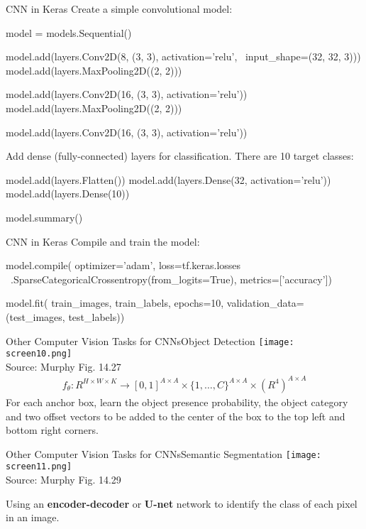 \documentclass[ignorenonframetext,xcolor=x11names]{beamer}
\begin{document}
\begin{frame}[fragile]{CNN in Keras}
Create a simple convolutional model:
\begin{pythoncode}
model = models.Sequential()

model.add(layers.Conv2D(8, (3, 3), activation='relu', \
    input_shape=(32, 32, 3)))
model.add(layers.MaxPooling2D((2, 2)))

model.add(layers.Conv2D(16, (3, 3), activation='relu'))
model.add(layers.MaxPooling2D((2, 2)))

model.add(layers.Conv2D(16, (3, 3), activation='relu'))
\end{pythoncode}
Add dense (fully-connected) layers for classification. There are 10 target classes:
\begin{pythoncode}
model.add(layers.Flatten())
model.add(layers.Dense(32, activation='relu'))
model.add(layers.Dense(10))

model.summary()
\end{pythoncode}
\end{frame}

\begin{frame}[fragile]{CNN in Keras}
Compile and train the model:
\begin{pythoncode}
model.compile(
    optimizer='adam',
    loss=tf.keras.losses \
        .SparseCategoricalCrossentropy(from_logits=True),
    metrics=['accuracy'])

model.fit(
    train_images, train_labels, epochs=10, 
    validation_data=(test_images, test_labels))
\end{pythoncode}
\end{frame}

\begin{frame}{Other Computer Vision Tasks for CNNs}{Object Detection}
\texttt{[image: screen10.png]} \\

\scriptsize Source: Murphy Fig. 14.27
\normalsize
\begin{align*}
f_\theta: R^{H\times W \times K} \rightarrow [0,1]^{A \times A} \times \{1, \ldots, C\}^{A \times A} \times (R^4)^{A \times A}
\end{align*}
For each anchor box, learn the object presence probability, the object category and two offset vectors to be added to the center of the box to the top left and bottom right corners.
\end{frame}

\begin{frame}{Other Computer Vision Tasks for CNNs}{Semantic Segmentation}
\texttt{[image: screen11.png]} \\

\scriptsize Source: Murphy Fig. 14.29
\normalsize
\vspace{\baselineskip}

Using an \textbf{encoder-decoder} or \textbf{U-net} network to identify the class of each pixel in an image.
\end{frame}
\end{document}
